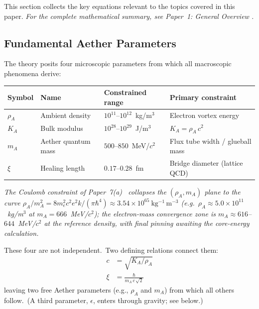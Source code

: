 ﻿\documentclass[12pt,letterpaper]{article}
\newcommand{\rhoa}{\rho_{\!A}}
\newcommand{\Ka}{K_{\!A}}
\begin{document}
This section collects the key equations relevant to the topics covered in this paper.
\noindent\textit{For the complete mathematical summary, see Paper~1: General Overview \cite{otto-overview}.}

\subsection{Fundamental Aether Parameters}

The theory posits four microscopic parameters from which all macroscopic
phenomena derive:
%
\begin{center}
\begin{tabular}{@{}llll@{}}
\hline
\textbf{Symbol} & \textbf{Name} & \textbf{Constrained range} & \textbf{Primary constraint} \\
\hline
$\rhoa$  & Ambient density     & $10^{11}$--$10^{12}$~kg/m$^3$         & Electron vortex energy \\
$\Ka$    & Bulk modulus         & $10^{28}$--$10^{29}$~J/m$^3$          & $\Ka = \rhoa\,c^2$ \\
$m_A$    & Aether quantum mass  & $500$--$850$~MeV/$c^2$                & Flux tube width / glueball mass \\
$\xi$    & Healing length       & $0.17$--$0.28$~fm                     & Bridge diameter (lattice QCD) \\
\hline
\end{tabular}
\end{center}

\noindent\textit{The Coulomb constraint of Paper~7(a)~\cite{otto-boundcore}
collapses the $(\rhoa, m_A)$ plane to the curve
$\rhoa/m_A^2 = 8 m_e^2 c^2 e^2 k/(\pi\hbar^4) \approx
3.54\times10^{65}~\mathrm{kg^{-1}\,m^{-3}}$ (e.g.\
$\rhoa \approx 5.0\times10^{11}$~kg/m$^3$ at $m_A = 666$~MeV/$c^2$); the
electron-mass convergence zone is $m_A \approx 616$--$644$~MeV/$c^2$ at the
reference density, with final pinning awaiting the core-energy calculation.}

These four are not independent.\ Two defining relations connect them:
%
\begin{align}
  c &= \sqrt{\Ka / \rhoa}
    \label{eq:sum-speed-of-light} \\
  \xi &= \frac{\hbar}{m_A\,c\,\sqrt{2}}
    \label{eq:sum-healing-length}
\end{align}
%
leaving two free Aether parameters (e.g., $\rhoa$ and $m_A$) from which all
others follow.\ (A third parameter, $\epsilon$, enters through gravity; see below.)
\end{document}
